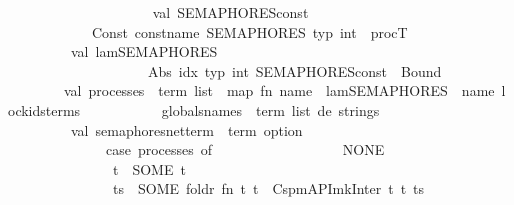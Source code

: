 \begin{isabellebody}
\ \ \ \ \ \ \ \ \ \ \isanewline
\ \ \ \ \ \ \ \ \ \ val\ SEMAPHORES{\isacharunderscore}{\kern0pt}const\ {\isacharequal}{\kern0pt}\isanewline
\ \ \ \ \ \ \ \ \ \ \ \ Const\ {\isacharparenleft}{\kern0pt}{\isacharat}{\kern0pt}{\isacharbraceleft}{\kern0pt}const{\isacharunderscore}{\kern0pt}name\ SEMAPHORES{\isacharbraceright}{\kern0pt}{\isacharcomma}{\kern0pt}\ {\isacharat}{\kern0pt}{\isacharbraceleft}{\kern0pt}typ\ int{\isacharbraceright}{\kern0pt}\ {\isacharminus}{\kern0pt}{\isacharminus}{\kern0pt}{\isachargreater}{\kern0pt}\ procT{\isacharparenright}{\kern0pt}\isanewline
\isanewline
\ \ \ \ \ \ \ \ \ val\ lam{\isacharunderscore}{\kern0pt}SEMAPHORES\ {\isacharequal}{\kern0pt}\isanewline
\ \ \ \ \ \ \ \ \ \ \ \ \ \ \ \ \ \ \ \ Abs\ {\isacharparenleft}{\kern0pt}{\isachardoublequote}{\kern0pt}idx{\isachardoublequote}{\kern0pt}{\isacharcomma}{\kern0pt}\ {\isacharat}{\kern0pt}{\isacharbraceleft}{\kern0pt}typ\ int{\isacharbraceright}{\kern0pt}{\isacharcomma}{\kern0pt}\ SEMAPHORES{\isacharunderscore}{\kern0pt}const\ {\isachardollar}{\kern0pt}\ Bound\ {}{\isacharparenright}{\kern0pt}\isanewline
\ \ \ \ \ \ \ \ val\ processes\ {\isacharcolon}{\kern0pt}\ term\ list\ {\isacharequal}{\kern0pt}\ map\ {\isacharparenleft}{\kern0pt}fn\ name\ {\isacharequal}{\kern0pt}{\isachargreater}{\kern0pt}\ lam{\isacharunderscore}{\kern0pt}SEMAPHORES\ {\isachardollar}{\kern0pt}\ name{\isacharparenright}{\kern0pt}\ lock{\isacharunderscore}{\kern0pt}ids{\isacharunderscore}{\kern0pt}terms\isanewline
\ \ \ \ \ \ \ \ \ \ {\isacharparenleft}{\kern0pt}{\isacharasterisk}{\kern0pt}\ globals{\isacharunderscore}{\kern0pt}names\ {\isacharcolon}{\kern0pt}\ term\ list\ de\ strings\ {\isacharasterisk}{\kern0pt}{\isacharparenright}{\kern0pt}\isanewline
\ \ \ \ \ \ \ \ \ \ \isanewline
\ \ \ \ \ \ \ {\isacharparenleft}{\kern0pt}{\isacharasterisk}{\kern0pt}\ \ val\ semaphores{\isacharunderscore}{\kern0pt}net{\isacharunderscore}{\kern0pt}term\ {\isacharcolon}{\kern0pt}\ term\ option\ {\isacharequal}{\kern0pt}\isanewline
\ \ \ \ \ \ \ \ \ \ \ \ \ \ case\ processes\ of\isanewline
\ \ \ \ \ \ \ \ \ \ \ \ \ \ \ \ {\isacharbrackleft}{\kern0pt}{\isacharbrackright}{\kern0pt}\ {\isacharequal}{\kern0pt}{\isachargreater}{\kern0pt}\ NONE\isanewline
\ \ \ \ \ \ \ \ \ \ \ \ \ \ {\isacharbar}{\kern0pt}\ {\isacharbrackleft}{\kern0pt}t{\isacharbrackright}{\kern0pt}\ {\isacharequal}{\kern0pt}{\isachargreater}{\kern0pt}\ SOME\ t\isanewline
\ \ \ \ \ \ \ \ \ \ \ \ \ \ {\isacharbar}{\kern0pt}\ ts\ {\isacharequal}{\kern0pt}{\isachargreater}{\kern0pt}\ SOME\ {\isacharparenleft}{\kern0pt}foldr{}\ {\isacharparenleft}{\kern0pt}fn\ {\isacharparenleft}{\kern0pt}t{}{\isacharcomma}{\kern0pt}\ t{}{\isacharparenright}{\kern0pt}\ {\isacharequal}{\kern0pt}{\isachargreater}{\kern0pt}\ Cspm{\isacharunderscore}{\kern0pt}API{\isachardot}{\kern0pt}mk{\isacharunderscore}{\kern0pt}Inter\ t{}\ t{}{\isacharparenright}{\kern0pt}\ ts{\isacharparenright}{\kern0pt}{\isacharasterisk}{\kern0pt}{\isacharparenright}{\kern0pt}\isanewline

\end{isabellebody}
